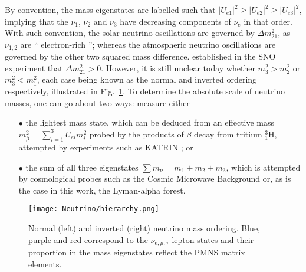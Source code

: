 By convention, the mass eigenstates are labelled such that $\vert U_{e1} \vert^2 \geqslant \vert U_{e2} \vert^2 \geqslant \vert U_{e3} \vert^2$, implying that the $\nu_1$, $\nu_2$ and $\nu_3$ have decreasing components of $\nu_e$ in that order. With such convention, the solar neutrino oscillations are governed by $\Delta m^2_{21}$, as $\nu_{1,2}$ are `` electron-rich ''; whereas the atmospheric neutrino oscillations are governed by the other two squared mass difference. \cite{Sudbury_osc} established in the SNO experiment that $\Delta m^2_{21} > 0$. However, it is still unclear today whether $m^2_3 > m^2_2$ or $m^2_3 < m^2_1$, each case being known as the normal and inverted ordering respectively, illustrated in Fig.~\ref{fig:hier}. To determine the absolute scale of neutrino masses, one can go about two ways: measure either\\

\begin{itemize}
\item[$\bullet$] the lightest mass state, which can be deduced from an effective mass $m^2_\beta = \displaystyle\sum_{i=1}^{3} U_{e i} m^2_i$ probed by the products of $\beta$ decay from tritium $^3_1 \mathrm{H}$, attempted by experiments such as KATRIN \citep{KATRIN}; or\\

\item[$\bullet$] the sum of all three eigenstates $\sum m_\nu = m_1 + m_2 + m_3$, which is attempted by cosmological probes such as the Cosmic Microwave Background or, as is the case in this work, the Lyman-alpha forest.
\end{itemize}

\begin{figure}
\begin{center}
\texttt{[image: Neutrino/hierarchy.png]}
\caption{Normal (left) and inverted (right) neutrino mass ordering. Blue, purple and red correspond to the $\nu_{e, \mu, \tau}$ lepton states and their proportion in the mass eigenstates reflect the PMNS matrix elements.}
\label{fig:hier}
\end{center}
\end{figure}


\clearpage